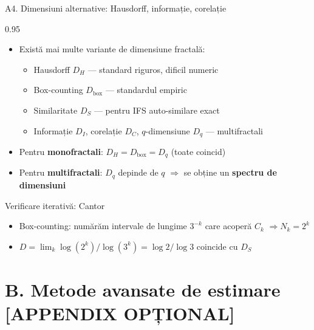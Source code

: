 \documentclass[9pt, aspectratio=169, t]{beamer}
\begin{document}
\begin{frame}[shrink=15]{A4. Dimensiuni alternative: Hausdorff, informație, corelație}
\begin{cminipage}{0.95\textwidth}
\begin{itemize}\setlength{\itemsep}{1pt}
    \item Există mai multe variante de dimensiune fractală:
    \begin{itemize}\setlength{\itemsep}{0pt}
        \item Hausdorff $D_H$ --- standard riguros, dificil numeric
        \item Box-counting $D_{\text{box}}$ --- standardul empiric
        \item Similaritate $D_S$ --- pentru IFS auto-similare exact
        \item Informație $D_I$, corelație $D_C$, $q$-dimensiune $D_q$ --- multifractali
    \end{itemize}
    \item Pentru \textbf{monofractali}: $D_H=D_{\text{box}}=D_q$ (toate coincid)
    \item Pentru \textbf{multifractali}: $D_q$ depinde de $q$ $\Rightarrow$ se obține un \textbf{spectru de dimensiuni}
\end{itemize}
\vspace{0.1cm}
\begin{exampleblock}{Verificare iterativă: Cantor}
\begin{itemize}\setlength{\itemsep}{0pt}
    \item Box-counting: numărăm intervale de lungime $3^{-k}$ care acoperă $C_k$ $\Rightarrow N_k=2^k$
    \item $D=\lim_k\log(2^k)/\log(3^k)=\log 2/\log 3$ \checkmark coincide cu $D_S$
\end{itemize}
\end{exampleblock}
\end{cminipage}
\end{frame}

\section*{B. Metode avansate de estimare [APPENDIX OPȚIONAL]}
\end{document}
